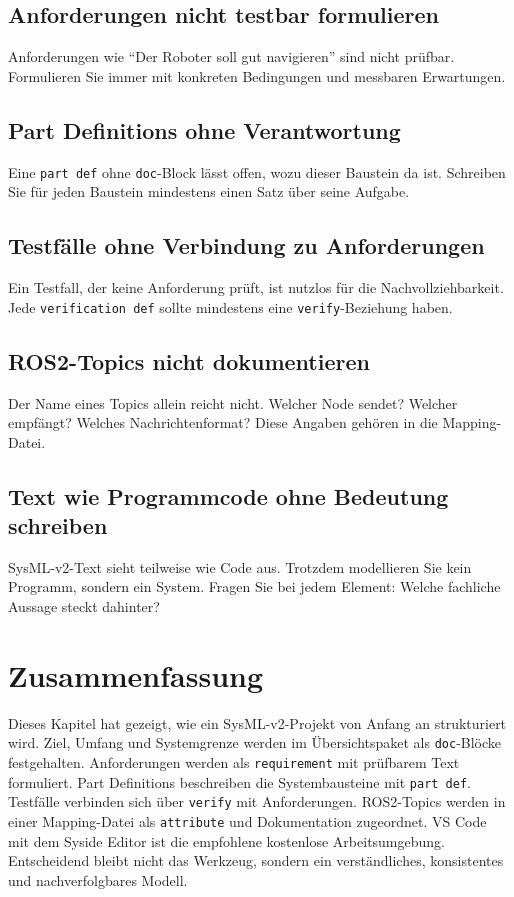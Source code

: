 \subsection{Anforderungen nicht testbar formulieren}
Anforderungen wie \enquote{Der Roboter soll gut navigieren} sind nicht prüfbar. Formulieren Sie immer mit konkreten Bedingungen und messbaren Erwartungen.

\subsection{Part Definitions ohne Verantwortung}
Eine \texttt{part def} ohne \texttt{doc}-Block lässt offen, wozu dieser Baustein da ist. Schreiben Sie für jeden Baustein mindestens einen Satz über seine Aufgabe.

\subsection{Testfälle ohne Verbindung zu Anforderungen}
Ein Testfall, der keine Anforderung prüft, ist nutzlos für die Nachvollziehbarkeit. Jede \texttt{verification def} sollte mindestens eine \texttt{verify}-Beziehung haben.

\subsection{ROS2-Topics nicht dokumentieren}
Der Name eines Topics allein reicht nicht. Welcher Node sendet? Welcher empfängt? Welches Nachrichtenformat? Diese Angaben gehören in die Mapping-Datei.

\subsection{Text wie Programmcode ohne Bedeutung schreiben}
SysML-v2-Text sieht teilweise wie Code aus. Trotzdem modellieren Sie kein Programm, sondern ein System. Fragen Sie bei jedem Element: Welche fachliche Aussage steckt dahinter?

\section{Zusammenfassung}
Dieses Kapitel hat gezeigt, wie ein SysML-v2-Projekt von Anfang an strukturiert wird. Ziel, Umfang und Systemgrenze werden im Übersichtspaket als \texttt{doc}-Blöcke festgehalten. Anforderungen werden als \texttt{requirement} mit prüfbarem Text formuliert. Part Definitions beschreiben die Systembausteine mit \texttt{part def}. Testfälle verbinden sich über \texttt{verify} mit Anforderungen. ROS2-Topics werden in einer Mapping-Datei als \texttt{attribute} und Dokumentation zugeordnet. VS Code mit dem Syside Editor ist die empfohlene kostenlose Arbeitsumgebung. Entscheidend bleibt nicht das Werkzeug, sondern ein verständliches, konsistentes und nachverfolgbares Modell.

